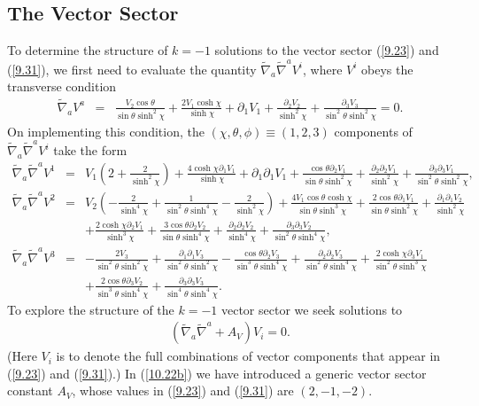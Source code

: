\documentclass[aps,onecolumn,10pt]{revtex4}
\numberwithin{equation}{section}
\numberwithin{equation}{section}
\begin{document}
\subsection{The Vector Sector}

To determine the structure of $k=-1$ solutions to the vector sector  (\ref{9.23}) and (\ref{9.31}), we first need to evaluate the quantity $\tilde{\nabla}_a\tilde{\nabla}^aV^i$, where $V^i$ obeys the transverse condition 
%
\begin{eqnarray}
\tilde\nabla_a V^a&=& \frac{V_{2} \cos\theta}{\sin\theta \sinh^2\chi} + \frac{2 V_{1} \cosh\chi}{\sinh\chi} + \partial_{1}V_{1} + \frac{\partial_{2}V_{2}}{\sinh^2\chi} + \frac{\partial_{3}V_{3}}{\sin^2\theta \sinh^2\chi}=0.
\label{10.20b}
\end{eqnarray}
%
On implementing this condition, the $(\chi,\theta,\phi) \equiv (1,2,3)$ components of $\tilde{\nabla}_a\tilde{\nabla}^aV^i$ take the form
% 
\begin{eqnarray}
\tilde{\nabla}_a\tilde{\nabla}^aV^1&=&V_{1} \left(2 + \frac{2}{\sinh^2\chi}\right) + \frac{4 \cosh\chi \partial_{1}V_{1}}{\sinh\chi} + \partial_{1}\partial_{1}V_{1} + \frac{\cos\theta \partial_{2}V_{1}}{\sin\theta \sinh^2\chi} + \frac{\partial_{2}\partial_{2}V_{1}}{\sinh^2\chi} + \frac{\partial_{3}\partial_{3}V_{1}}{\sin^2\theta \sinh^2\chi},
 \nonumber\\ 
\tilde{\nabla}_a\tilde{\nabla}^aV^2&=& V_{2} \left(- \frac{2}{\sinh^4\chi} + \frac{1}{\sin^2\theta \sinh^4\chi} -  \frac{2}{\sinh^2\chi}\right) + \frac{4 V_{1} \cos\theta \cosh\chi}{\sin\theta \sinh^3\chi} + \frac{2 \cos\theta \partial_{1}V_{1}}{\sin\theta \sinh^2\chi} + \frac{\partial_{1}\partial_{1}V_{2}}{\sinh^2\chi} \nonumber \\ 
&& + \frac{2 \cosh\chi \partial_{2}V_{1}}{\sinh^3\chi} + \frac{3 \cos\theta \partial_{2}V_{2}}{\sin\theta \sinh^4\chi} + \frac{\partial_{2}\partial_{2}V_{2}}{\sinh^4\chi} + \frac{\partial_{3}\partial_{3}V_{2}}{\sin^2\theta \sinh^4\chi},
\nonumber\\ 
\tilde{\nabla}_a\tilde{\nabla}^aV^3&=& - \frac{2 V_{3}}{\sin^2\theta \sinh^2\chi} + \frac{\partial_{1}\partial_{1}V_{3}}{\sin^2\theta \sinh^2\chi} -  \frac{\cos\theta \partial_{2}V_{3}}{\sin^3\theta \sinh^4\chi} + \frac{\partial_{2}\partial_{2}V_{3}}{\sin^2\theta \sinh^4\chi} + \frac{2 \cosh\chi \partial_{3}V_{1}}{\sin^2\theta \sinh^3\chi} \nonumber \\ 
&& + \frac{2 \cos\theta \partial_{3}V_{2}}{\sin^3\theta \sinh^4\chi} + \frac{\partial_{3}\partial_{3}V_{3}}{\sin^4\theta \sinh^4\chi}.
\label{10.21b}
\end{eqnarray}
% 
To explore the structure of the $k=-1$ vector sector we seek solutions to
%
\begin{eqnarray}
(\tilde{\nabla}_a\tilde{\nabla}^a+A_V)V_i=0.
\label{10.22b}
\end{eqnarray}
%
(Here $V_i$ is to denote the full combinations of vector components that appear in (\ref{9.23}) and (\ref{9.31}).) In (\ref{10.22b}) we have introduced a generic vector sector constant $A_V$, whose values in (\ref{9.23}) and (\ref{9.31})  are $(2,-1,-2)$.
\end{document}
